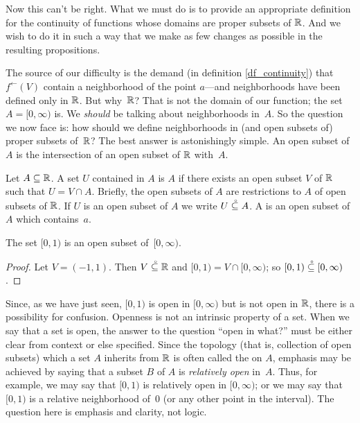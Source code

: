 Now this can't be right.  What we must do is to provide an appropriate definition for the
continuity of functions whose domains are proper subsets of $\mathbb{R}$.  And we wish to do it in
such a way that we make as few changes as possible in the resulting propositions.

The source of our difficulty is the demand (in definition \ref{df_continuity}) that
$f^\gets(V)$ contain a neighborhood of the point $a$---and neighborhoods have been defined
only in $\mathbb{R}$. But why~$\mathbb{R}$?  That is not the domain of our function; the set $A = [0,\infty)$
is.  We \emph{should} be talking about neighborhoods in~$A$.  So the question we now face is:
how should we define neighborhoods in (and open subsets of) proper subsets of~$\mathbb{R}$?  The best
answer is astonishingly simple.  An open subset of $A$ is the intersection of an open subset
of $\mathbb{R}$ with~$A$.

\begin{defn}\label{rel_open} Let $A \subseteq \mathbb{R}$. A set $U$ contained in $A$ is
 $A$ if there exists an open subset $V$ of $\mathbb{R}$ such that $U = V \cap A$.
Briefly, the open subsets of $A$ are restrictions to $A$ of open subsets of $\mathbb{R}$.  If $U$ is
an open subset of $A$ we write $U\overset{\thickspace{}_\circ}{\subseteq}A$.  A  is an open
subset of $A$ which contains~$a$.
\end{defn}

\begin{exam} The set $[0,1)$ is an open subset of~$[0,\infty)$.
\end{exam}

\begin{proof} Let $V = (-1,1)$. Then $V\overset{\thickspace{}_\circ}{\subseteq}\mathbb{R}$ and $[0,1) = V
\cap [0,\infty)$; so $[0,1)\overset{\thickspace{}_\circ}{\subseteq}[0,\infty)$.
\end{proof}

Since, as we have just seen, $[0,1)$ is open in $[0,\infty)$ but is not open in $\mathbb{R}$, there is
a possibility for confusion.  Openness is not an intrinsic property of a set.  When we say
that a set is open, the answer to the question ``open in what?'' must be either clear from
context or else specified.  Since the topology (that is, collection of open subsets) which a
set $A$ inherits from $\mathbb{R}$ is often called the
 on $A$, emphasis may be achieved by saying
that a subset $B$ of $A$ is
\emph{relatively open} in~$A$. Thus, for example, we may say that
$[0,1)$ is relatively open in $[0,\infty)$; or we may say that
$[0,1)$ is a
relative neighborhood of~$0$ (or any other point in the interval).
The question here is emphasis and clarity, not logic.

